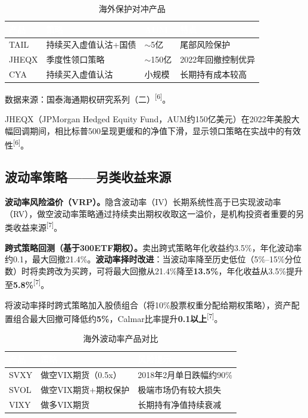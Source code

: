 \documentclass[10pt,a4paper,twocolumn]{ctexart}
\begin{document}
\begin{table}[H]
\centering\scriptsize
\caption{海外保护对冲产品}
\label{tab:hedge}
\renewcommand{\arraystretch}{1.25}
\setlength{\tabcolsep}{3pt}
\begin{tabularx}{\columnwidth}{@{}C{1.0cm}XC{0.8cm}X@{}}
\toprule
{}
\textcolor{white}{\textbf{产品}} &
\textcolor{white}{\textbf{策略}} &
\textcolor{white}{\textbf{AUM}} &
\textcolor{white}{\textbf{特点}} \\
\midrule
TAIL  & 持续买入虚值认沽+国债 & $\sim$5亿  & 尾部风险保护 \\
JHEQX & 季度性领口策略        & $\sim$150亿 & 2022年回撤控制优异 \\
CYA   & 持续买入虚值认沽      & 小规模     & 长期持有成本较高 \\
\bottomrule
\end{tabularx}
\end{table}

{\scriptsize 数据来源：国泰海通期权研究系列（二）\textsuperscript{[6]}。}

JHEQX（JPMorgan Hedged Equity Fund，AUM约150亿美元）在2022年美股大幅回调期间，相比标普500呈现更缓和的净值下滑，显示领口策略在实战中的有效性\textsuperscript{[6]}。

\subsection{波动率策略——另类收益来源}

\textbf{波动率风险溢价（VRP）。}隐含波动率（IV）长期系统性高于已实现波动率（RV），做空波动率策略通过持续卖出期权收取这一溢价，是机构投资者重要的另类收益来源\textsuperscript{[7]}。

\textbf{跨式策略回测（基于300ETF期权）。}卖出跨式策略年化收益约3.5\%，年化波动率约0.1，最大回撤21.4\%。\textbf{波动率择时改进}：当波动率降至历史低位（5\%--15\%分位数）时将卖跨改为买跨，可将最大回撤从21.4\%降至\textbf{13.5\%}，年化收益从3.5\%提升至\textbf{5.8\%}\textsuperscript{[7]}。

\begin{infobox}[组合配置价值]
\scriptsize
将波动率择时跨式策略加入股债组合（将10\%股票权重分配给期权策略），资产配置组合最大回撤可降低约\textbf{5\%}，Calmar比率提升\textbf{0.1以上}\textsuperscript{[7]}。
\end{infobox}

\begin{table}[H]
\centering\scriptsize
\caption{海外波动率产品对比}
\label{tab:vol}
\renewcommand{\arraystretch}{1.25}
\setlength{\tabcolsep}{3pt}
\begin{tabularx}{\columnwidth}{@{}C{0.9cm}L{1.8cm}X@{}}
\toprule
{}
\textcolor{white}{\textbf{产品}} &
\textcolor{white}{\textbf{策略}} &
\textcolor{white}{\textbf{风险提示}} \\
\midrule
SVXY  & 做空VIX期货（0.5x）    & 2018年2月单日跌幅约90\% \\
SVOL  & 做空VIX期货+期权保护   & 极端市场仍有较大损失 \\
VIXY  & 做多VIX期货            & 长期持有净值持续衰减 \\
\bottomrule
\end{tabularx}
\end{table}
\end{document}
